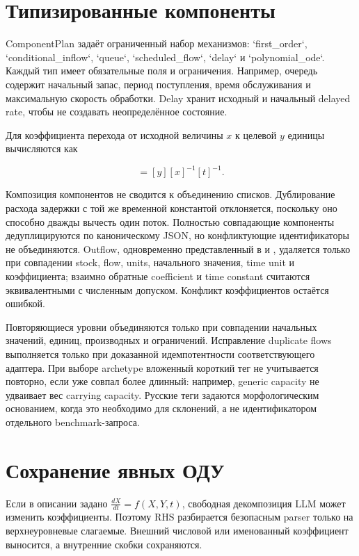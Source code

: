 \section{Типизированные компоненты}

ComponentPlan задаёт ограниченный набор механизмов: `first\_order`, `conditional\_inflow`, `queue`, `scheduled\_flow`, `delay` и `polynomial\_ode`. Каждый тип имеет обязательные поля и ограничения. Например, очередь содержит начальный запас, период поступления, время обслуживания и максимальную скорость обработки. Delay хранит исходный и начальный delayed rate, чтобы не создавать неопределённое состояние.

Для коэффициента перехода от исходной величины $x$ к целевой $y$ единицы вычисляются как

\begin{equation}
    [k]=[y][x]^{-1}[t]^{-1}.
    \label{eq:coefficient-units}
\end{equation}

Композиция компонентов не сводится к объединению списков. Дублирование расхода задержки с той же временной константой отклоняется, поскольку оно способно дважды вычесть один поток. Полностью совпадающие компоненты дедуплицируются по каноническому JSON, но конфликтующие идентификаторы не объединяются. Outflow, одновременно представленный в  и , удаляется только при совпадении stock, flow, units, начального значения, time unit и коэффициента; взаимно обратные coefficient и time constant считаются эквивалентными с численным допуском. Конфликт коэффициентов остаётся ошибкой.

Повторяющиеся уровни объединяются только при совпадении начальных значений, единиц, производных и ограничений. Исправление duplicate flows выполняется только при доказанной идемпотентности соответствующего адаптера. При выборе archetype вложенный короткий тег не учитывается повторно, если уже совпал более длинный: например, generic capacity не удваивает вес carrying capacity. Русские теги задаются морфологическим основанием, когда это необходимо для склонений, а не идентификатором отдельного benchmark-запроса.

\section{Сохранение явных ОДУ}

Если в описании задано $\frac{dX}{dt}=f(X,Y,t)$, свободная декомпозиция LLM может изменить коэффициенты. Поэтому RHS разбирается безопасным parser только на верхнеуровневые слагаемые. Внешний числовой или именованный коэффициент выносится, а внутренние скобки сохраняются.

